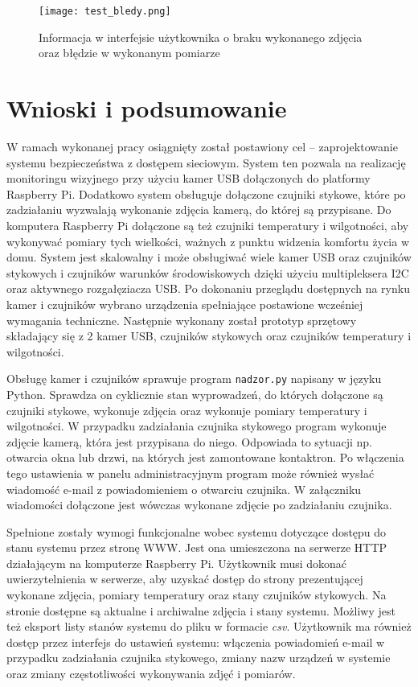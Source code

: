 \documentclass[a4paper,11pt,twoside]{article}
\begin{document}
\begin{figure}[H]
\begin{center}
\texttt{[image: test\_bledy.png]}
\caption{Informacja w interfejsie użytkownika o braku wykonanego zdjęcia oraz błędzie w wykonanym pomiarze}
\label{fig: test_bledy}
\end{center}
\end{figure}


\newpage
\section{Wnioski i podsumowanie}
W ramach wykonanej pracy osiągnięty został postawiony cel -- zaprojektowanie systemu bezpieczeństwa z dostępem sieciowym. System ten pozwala na realizację monitoringu wizyjnego przy użyciu kamer USB dołączonych do platformy Raspberry Pi. Dodatkowo system obsługuje dołączone czujniki stykowe, które po zadziałaniu wyzwalają wykonanie zdjęcia kamerą, do której są przypisane. Do komputera Raspberry Pi dołączone są też czujniki temperatury i wilgotności, aby wykonywać pomiary tych wielkości, ważnych z punktu widzenia komfortu życia w domu. System jest skalowalny i może obsługiwać wiele kamer USB oraz czujników stykowych i czujników warunków środowiskowych dzięki użyciu multipleksera I2C oraz aktywnego rozgałęziacza USB. Po dokonaniu przeglądu dostępnych na rynku kamer i czujników wybrano urządzenia spełniające postawione wcześniej wymagania techniczne. Następnie wykonany został prototyp sprzętowy składający się z 2 kamer USB, czujników stykowych oraz czujników temperatury i wilgotności.

Obsługę kamer i czujników sprawuje program \texttt{nadzor.py} napisany w języku Python. Sprawdza on cyklicznie stan wyprowadzeń, do których dołączone są czujniki stykowe, wykonuje zdjęcia oraz wykonuje pomiary temperatury i wilgotności. W przypadku zadziałania czujnika stykowego program wykonuje zdjęcie kamerą, która jest przypisana do niego. Odpowiada to sytuacji np. otwarcia okna lub drzwi, na których jest zamontowane kontaktron. Po włączenia tego ustawienia w panelu administracyjnym program może również wysłać wiadomość e-mail z powiadomieniem o otwarciu czujnika. W załączniku wiadomości dołączone jest wówczas wykonane zdjęcie po zadziałaniu czujnika.

Spełnione zostały wymogi funkcjonalne wobec systemu dotyczące dostępu do stanu systemu przez stronę WWW. Jest ona umieszczona na serwerze HTTP działającym na komputerze Raspberry Pi. Użytkownik musi dokonać uwierzytelnienia w serwerze, aby uzyskać dostęp do strony prezentującej wykonane zdjęcia, pomiary temperatury oraz stany czujników stykowych. Na stronie dostępne są aktualne i archiwalne zdjęcia i stany systemu. Możliwy jest też eksport listy stanów systemu do pliku w formacie \textit{csv}. Użytkownik ma również dostęp przez interfejs do ustawień systemu: włączenia powiadomień e-mail w przypadku zadziałania czujnika stykowego, zmiany nazw urządzeń w systemie oraz zmiany częstotliwości wykonywania zdjęć i pomiarów.
\end{document}
